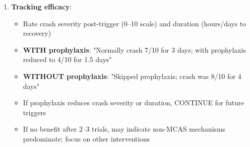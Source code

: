 \begin{recommendation}
\begin{enumerate}
\begin{itemize}
        \item \textbf{Strict low-histamine diet} (absolute adherence 1--2 days pre-trigger):
        \begin{itemize}
            \item Eliminate all aged/fermented foods entirely
            \item Consume ONLY fresh foods prepared day-of
            \item Avoid known personal triggers (red wine, chocolate, etc.)
        \end{itemize}

        \item \textbf{Adjunctive support}:
        \begin{itemize}
            \item Quercetin 500--1000 mg BID (increase to TID if available)
            \item Vitamin C 1000 mg BID (increase to TID; supports DAO enzyme)
            \item Omega-3 PUFA 2--3 g daily (natural mast cell-stabilizing effect)
        \end{itemize}

        \item \textbf{Activity pacing stringency} (MOST CRITICAL):
        \begin{itemize}
            \item Reduce activity to absolute minimum during trigger window
            \item Pre-trigger: Rest heavily 24 hours before known high-demand activity
            \item During trigger: Minimize exertion; stay in cool, low-stimulation environment
            \item Post-trigger: Continue prophylactic protocol for 24--48 hours; expect residual MCAS activation
        \end{itemize}
    \end{itemize}

    \item \textbf{Tracking efficacy}:
    \begin{itemize}
        \item Rate crash severity post-trigger (0--10 scale) and duration (hours/days to recovery)
        \item \textbf{WITH prophylaxis}: "Normally crash 7/10 for 3 days; with prophylaxis reduced to 4/10 for 1.5 days"
        \item \textbf{WITHOUT prophylaxis}: "Skipped prophylaxis; crash was 8/10 for 4 days"
        \item If prophylaxis reduces crash severity or duration, CONTINUE for future triggers
        \item If no benefit after 2--3 trials, may indicate non-MCAS mechanisms predominate; focus on other interventions
    \end{itemize}
\end{enumerate}


\end{recommendation}
